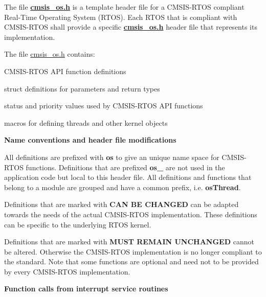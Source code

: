 The file {\bfseries{\mbox{\hyperlink{cmsis__os_8h}{cmsis\+\_\+os.\+h}}}} is a template header file for a C\+M\+S\+I\+S-\/\+R\+T\+OS compliant Real-\/\+Time Operating System (R\+T\+OS). Each R\+T\+OS that is compliant with C\+M\+S\+I\+S-\/\+R\+T\+OS shall provide a specific {\bfseries{\mbox{\hyperlink{cmsis__os_8h}{cmsis\+\_\+os.\+h}}}} header file that represents its implementation.

The file \mbox{\hyperlink{cmsis__os_8h}{cmsis\+\_\+os.\+h}} contains\+:
\begin{DoxyItemize}
\item C\+M\+S\+I\+S-\/\+R\+T\+OS A\+PI function definitions
\item struct definitions for parameters and return types
\item status and priority values used by C\+M\+S\+I\+S-\/\+R\+T\+OS A\+PI functions
\item macros for defining threads and other kernel objects
\end{DoxyItemize}

{\bfseries{Name conventions and header file modifications}}

All definitions are prefixed with {\bfseries{os}} to give an unique name space for C\+M\+S\+I\+S-\/\+R\+T\+OS functions. Definitions that are prefixed {\bfseries{os\+\_\+}} are not used in the application code but local to this header file. All definitions and functions that belong to a module are grouped and have a common prefix, i.\+e. {\bfseries{os\+Thread}}.

Definitions that are marked with {\bfseries{C\+AN BE C\+H\+A\+N\+G\+ED}} can be adapted towards the needs of the actual C\+M\+S\+I\+S-\/\+R\+T\+OS implementation. These definitions can be specific to the underlying R\+T\+OS kernel.

Definitions that are marked with {\bfseries{M\+U\+ST R\+E\+M\+A\+IN U\+N\+C\+H\+A\+N\+G\+ED}} cannot be altered. Otherwise the C\+M\+S\+I\+S-\/\+R\+T\+OS implementation is no longer compliant to the standard. Note that some functions are optional and need not to be provided by every C\+M\+S\+I\+S-\/\+R\+T\+OS implementation.

{\bfseries{Function calls from interrupt service routines}}

